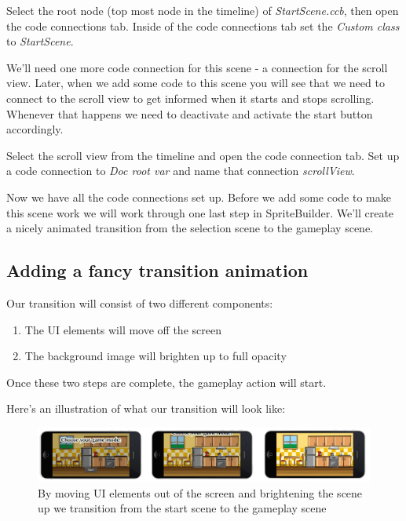 \begin{leftbar}
Select the root node (top most node in the timeline) of \textit{StartScene.ccb},
then open the code connections tab. Inside of the code connections tab set the
\textit{Custom class} to \textit{StartScene}.
\end{leftbar}

We'll need one more code connection for this scene - a connection for the
scroll view. Later, when we add some code to this scene you will see that we
need to connect to the scroll view to get informed when it
starts and stops scrolling. Whenever that happens we need to deactivate and
activate the start button accordingly.

\begin{leftbar}
Select the scroll view from the timeline and open the code connection tab. Set
up a code connection to \textit{Doc root var} and name that connection
\textit{scrollView}.
\end{leftbar}

Now we have all the code connections set up. Before we add some code to make
this scene work we will work through one last step in SpriteBuilder. We'll
create a nicely animated transition from the selection scene to the gameplay scene.

\subsection{Adding a fancy transition animation}

Our transition will consist of two different components:
\begin{enumerate}
  \item The UI elements will move off the screen
  \item The background image will brighten up to full opacity
\end{enumerate}

Once these two steps are complete, the gameplay action will start.

Here's an illustration of what our transition will look like:
\begin{figure}[H]
		\centering
		\includegraphics[width=0.85\linewidth]{images/Chapter7/gameplay_transition.png}
		\caption{By moving UI elements out of the screen and brightening the scene up
		we transition from the start scene to the gameplay scene}
\end{figure}

